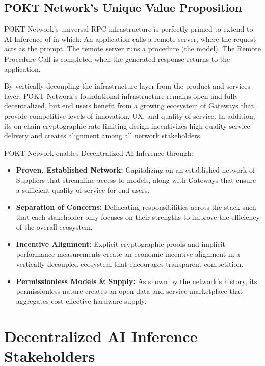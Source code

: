 \documentclass[conference,compsoc]{IEEEtran}
\begin{document}
\subsection{POKT Network’s Unique Value Proposition}

POKT Network’s universal RPC infrastructure is perfectly primed to extend to AI Inference of in which:
An application calls a remote server, where the request acts as the prompt.
The remote server runs a procedure (the model).
The Remote Procedure Call is completed when the generated response returns to the application.

By vertically decoupling the infrastructure layer from the product and services layer, POKT Network’s foundational infrastructure remains open and fully decentralized, but end users benefit from a growing ecosystem of Gateways that provide competitive levels of innovation, UX, and quality of service. In addition, its on-chain cryptographic rate-limiting design incentivizes high-quality service delivery and creates alignment among all network stakeholders. 

POKT Network enables Decentralized AI Inference through:
\begin{itemize}
    \item \textbf{Proven, Established Network:} Capitalizing on an established network of Suppliers that streamline access to models, along with Gateways that ensure a sufficient quality of service for end users.
    \item \textbf{Separation of Concerns:} Delineating responsibilities across the stack such that each stakeholder only focuses on their strengths to improve the efficiency of the overall ecosystem.
    \item \textbf{Incentive Alignment:} Explicit cryptographic proofs and implicit performance measurements create an economic incentive alignment in a vertically decoupled ecosystem that encourages transparent competition.
    \item \textbf{Permissionless Models \& Supply:} As shown by the network’s history, its permissionless nature creates an open data and service marketplace that aggregates cost-effective hardware supply.
\end{itemize}


\section{Decentralized AI Inference Stakeholders}
\end{document}
